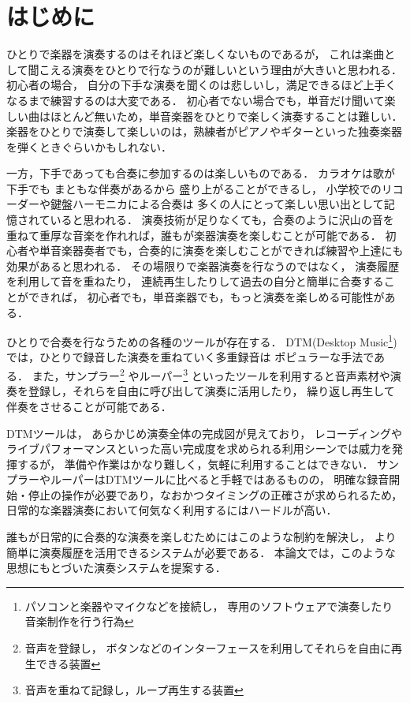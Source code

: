 %
%
\section{はじめに}
\label{sec:start}

ひとりで楽器を演奏するのはそれほど楽しくないものであるが，
これは楽曲として聞こえる演奏をひとりで行なうのが難しいという理由が大きいと思われる．
%
初心者の場合， 自分の下手な演奏を聞くのは悲しいし，満足できるほど上手くなるまで練習するのは大変である．
初心者でない場合でも，単音だけ聞いて楽しい曲はほとんど無いため，単音楽器をひとりで楽しく演奏することは難しい．
楽器をひとりで演奏して楽しいのは，熟練者がピアノやギターといった独奏楽器を弾くときぐらいかもしれない．

一方，下手であっても合奏に参加するのは楽しいものである．
カラオケは歌が下手でも
まともな伴奏があるから
盛り上がることができるし，
小学校でのリコーダーや鍵盤ハーモニカによる合奏は
多くの人にとって楽しい思い出として記憶されていると思われる．
演奏技術が足りなくても，合奏のように沢山の音を重ねて重厚な音楽を作れれば，誰もが楽器演奏を楽しむことが可能である．
初心者や単音楽器奏者でも，合奏的に演奏を楽しむことができれば練習や上達にも効果があると思われる．
%
その場限りで楽器演奏を行なうのではなく，
演奏履歴を利用して音を重ねたり，
連続再生したりして過去の自分と簡単に合奏することができれば，
初心者でも，単音楽器でも，もっと演奏を楽しめる可能性がある．

ひとりで合奏を行なうための各種のツールが存在する．
%
DTM(Desktop Music\footnote{パソコンと楽器やマイクなどを接続し，
    専用のソフトウェアで演奏したり音楽制作を行う行為})
では，ひとりで録音した演奏を重ねていく多重録音は
ポピュラーな手法である\cite{jacob}\cite{resound}．
%
%
また，サンプラー\footnote{音声を登録し，
    ボタンなどのインターフェースを利用してそれらを自由に再生できる装置}
やルーパー\footnote{音声を重ねて記録し，ループ再生する装置}
といったツールを利用すると音声素材や演奏を登録し，それらを自由に呼び出して演奏に活用したり，
繰り返し再生して伴奏をさせることが可能である．

DTMツールは，
あらかじめ演奏全体の完成図が見えており，
レコーディングやライブパフォーマンスといった高い完成度を求められる利用シーンでは威力を発揮するが，
準備や作業はかなり難しく，気軽に利用することはできない．
%
サンプラーやルーパーはDTMツールに比べると手軽ではあるものの，
明確な録音開始・停止の操作が必要であり，なおかつタイミングの正確さが求められるため，
日常的な楽器演奏において何気なく利用するにはハードルが高い．

誰もが日常的に合奏的な演奏を楽しむためにはこのような制約を解決し，
より簡単に演奏履歴を活用できるシステムが必要である．
本論文では，このような思想にもとづいた演奏システム{\system}を提案する．
